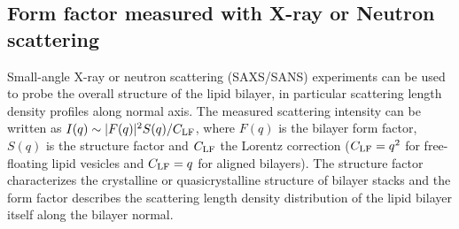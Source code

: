 \documentclass[aps,prl,superscriptaddress,twocolumn]{revtex4}
\begin{document}

\subsection{Form factor measured with X-ray or Neutron scattering}

Small-angle X-ray or neutron scattering (SAXS/SANS) experiments can be used to
probe the overall structure of the lipid bilayer, in particular scattering length density profiles along normal axis.
The measured scattering intensity can be written as 
$I(q)\sim|F(q)|^2S(q) / C_{{\rm LF}}$, where $F(q)$ is the bilayer form 
factor, $S(q)$ is the structure factor and $C_{{\rm LF}}$ the Lorentz correction ($C_{{\rm LF}} = q^2$ 
for free-floating lipid vesicles and $C_{{\rm LF}}=q$ for aligned bilayers). 
The structure factor characterizes the crystalline or quasicrystalline structure of bilayer 
stacks and the form factor describes the scattering length density distribution of the lipid bilayer 
itself along the bilayer normal. 
\end{document}
